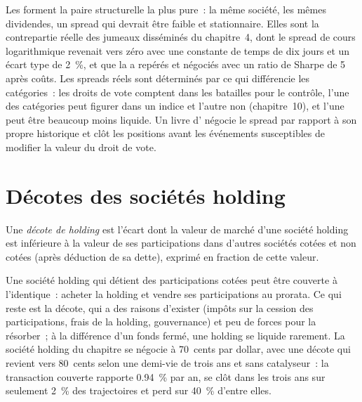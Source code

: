 Les  forment la paire structurelle la plus pure~: la même société, les mêmes dividendes, un spread qui devrait être faible et stationnaire. Elles sont la
contrepartie réelle des jumeaux disséminés du chapitre~4, dont le spread de cours logarithmique revenait vers zéro avec une constante de temps de dix jours et un écart type de 2~\%, et que la
 a repérés et négociés avec un ratio de Sharpe de 5 après coûts. Les spreads réels sont déterminés par ce qui différencie les catégories~: les droits de vote
comptent dans les batailles pour le contrôle, l'une des catégories peut figurer dans un indice et l'autre non (chapitre~10), et l'une peut être beaucoup moins liquide. Un livre d' négocie le
spread par rapport à son propre historique et clôt les positions avant les événements susceptibles de modifier la valeur du droit de vote.

\section{Décotes des sociétés holding}

\begin{definition}\label{def:s1:share-classes-holding-companies-closed-end-funds-spacs:holding}
Une \emph{décote de holding} est l'écart dont la valeur de marché d'une société holding est inférieure à la valeur de ses participations dans d'autres sociétés cotées et
non cotées (après déduction de sa dette), exprimé en fraction de cette valeur.
\end{definition}

Une société holding qui détient des participations cotées peut être couverte à l'identique~: acheter la holding et vendre ses participations au prorata. Ce qui reste est la décote,
qui a des raisons d'exister (impôts sur la cession des participations, frais de la holding, gouvernance) et peu de forces pour la résorber~; à la différence d'un fonds fermé, une holding
se liquide rarement. La société holding du chapitre se négocie à 70~cents par dollar, avec une décote qui revient vers 80~cents selon une demi-vie de trois
ans et sans catalyseur~: la transaction couverte rapporte 0.94~\% par an, se clôt dans les trois ans sur seulement 2~\% des trajectoires et perd sur 40~\% d'entre elles.

